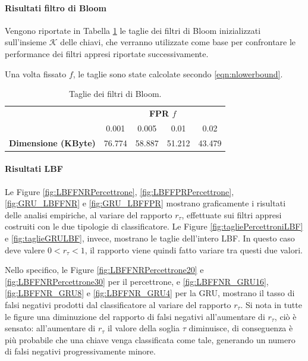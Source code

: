 \documentclass[../../main.tex]{subfiles}
\begin{document}
    \paragraph{Risultati filtro di Bloom}

    Vengono riportate in Tabella \ref{tab:taglieFiltro} le taglie dei filtri di Bloom inizializzati sull'insieme $\mathcal{K}$ delle chiavi, che verranno utilizzate come base per confrontare le performance dei filtri appresi riportate successivamente.

    Una volta fissato $f$, le taglie sono state calcolate secondo \eqref{eqn:nlowerbound}.
    
    \begin{table}[H]
        \centering
        \begin{tabular}{lcccc}
            \toprule
            {} & \multicolumn{4}{c}{\textbf{FPR $f$}}\\
            {} & 0.001 & 0.005 & 0.01 & 0.02\\
            \midrule
            \textbf{Dimensione (KByte)} & 76.774 & 58.887 & 51.212 & 43.479\\
            \bottomrule
        \end{tabular}
        \caption{Taglie dei filtri di Bloom.}
        \label{tab:taglieFiltro}
    \end{table}

    \paragraph{Risultati LBF}
    Le Figure \ref{fig:LBFFNRPercettrone}, \ref{fig:LBFFPRPercettrone}, \ref{fig:GRU_LBFFNR} e \ref{fig:GRU_LBFFPR} mostrano graficamente i risultati delle analisi empiriche, al variare del rapporto $r_{\tau}$, effettuate sui filtri appresi costruiti con le due tipologie di classificatore. Le Figure \ref{fig:tagliePercettroniLBF} e \ref{fig:taglieGRULBF}, invece, mostrano le taglie dell'intero LBF. In questo caso deve valere $0 < r_{\tau} < 1$, il rapporto viene quindi fatto variare tra questi due valori.

    Nello specifico, le Figure \ref{fig:LBFFNRPercettrone20} e \ref{fig:LBFFNRPercettrone30} per il percettrone, e \ref{fig:LBFFNR_GRU16}, \ref{fig:LBFFNR_GRU8} e \ref{fig:LBFFNR_GRU4} per la GRU, mostrano il tasso di falsi negativi prodotti dal classificatore al variare del rapporto $r_{\tau}$. Si nota in tutte le figure una diminuzione del rapporto di falsi negativi all'aumentare di $r_{\tau}$, ciò è sensato: all'aumentare di $r_{\tau}$ il valore della soglia $\tau$ diminuisce, di conseguenza è più probabile che una chiave venga classificata come tale, generando un numero di falsi negativi progressivamente minore.
\end{document}
